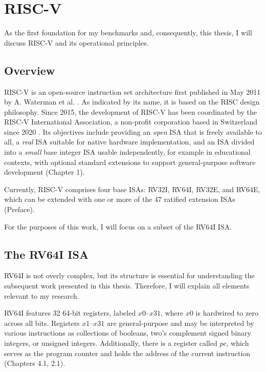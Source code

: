 \chapter{RISC-V}\label{chap:riscv}

As the first foundation for my benchmarks and, consequently, this thesis, I will discuss RISC-V and its operational principles.

\section{Overview}

RISC-V is an open-source instruction set architecture first published in May
2011 by A. Waterman et al. \cite{first_riscv}. As indicated by its name, it is
based on the RISC design philosophy.  Since
2015, the development of RISC-V has been coordinated by the RISC-V International
Association, a non-profit corporation based in Switzerland since 2020
\cite{riscvorg}. Its objectives include providing an \emph{open} ISA that is freely
available to all, a \emph{real} ISA suitable for native hardware implementation,
and an ISA divided into a \emph{small} base integer ISA usable independently,
for example in educational contexts, with optional standard extensions to
support general-purpose software development \cite{riscv-isa}(Chapter 1).

Currently, RISC-V comprises four base ISAs: RV32I, RV64I, RV32E, and RV64E,
which can be extended with one or more of the 47 ratified extension ISAs
\cite{riscv-isa} (Preface).

 

For the purposes of this work, I will focus on a subset of the RV64I ISA.

\section{The RV64I ISA}
RV64I is not overly complex, but its structure is essential for understanding the
subsequent work presented in this thesis. Therefore, I will explain all elements
relevant to my research.

RV64I features 32 64-bit registers, labeled $x0$–$x31$, where $x0$ is hardwired to
zero across all bits. Registers $x1$–$x31$ are general-purpose and may be
interpreted by various instructions as collections of booleans, two's complement
signed binary integers, or unsigned integers. Additionally, there is a register
called $pc$, which serves as the program counter and holds the address of the
current instruction \cite{riscv-isa}(Chapters 4.1, 2.1).

